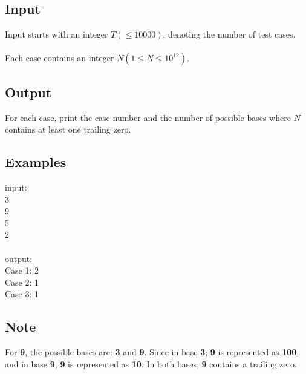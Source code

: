 \documentclass[10pt,a4paper]{article}
\begin{document}
\subsection*{Input}
Input starts with an integer $T (\leq 10000)$, denoting the number of test cases.
\\ \\
Each case contains an integer $N (1 \leq N \leq 10^{12})$.
\subsection*{Output}
For each case, print the case number and the number of possible bases where $N$ contains at least one trailing zero.
\subsection*{Examples}
input: \\
3 \\
9 \\
5 \\
2 \\
\\
output: \\
Case 1: 2 \\
Case 2: 1 \\
Case 3: 1 
\subsection*{Note}
For \textbf{9}, the possible bases are: \textbf{3} and \textbf{9}. Since in base \textbf{3}; \textbf{9} is represented as \textbf{100}, and in base \textbf{9}; \textbf{9} is represented as \textbf{10}. In both bases, \textbf{9} contains a trailing zero.
\end{document}
